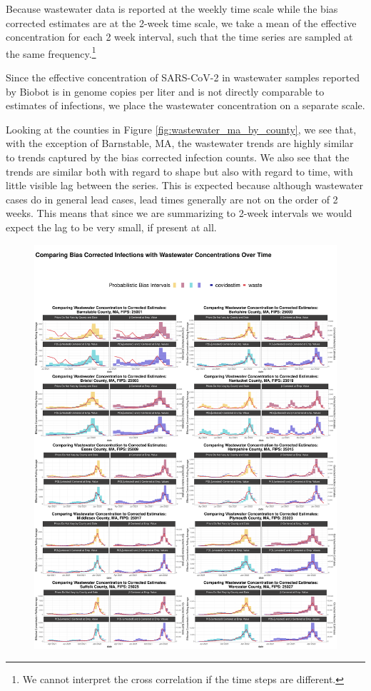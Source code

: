 \documentclass[12pt,twoside]{smiththesis}
\begin{document}
Because wastewater data is reported at the weekly time scale while the bias corrected estimates are at the 2-week time scale, we take a mean of the effective concentration for each 2 week interval, such that the time series are sampled at the same frequency.\footnote{We cannot interpret the cross correlation if the time steps are different.}

Since the effective concentration of SARS-CoV-2 in wastewater samples reported by Biobot is in genome copies per liter and is not directly comparable to estimates of infections, we place the wastewater concentration on a separate scale.

Looking at the counties in Figure \ref{fig:wastewater_ma_by_county}, we see that, with the exception of Barnstable, MA, the wastewater trends are highly similar to trends captured by the bias corrected infection counts. We also see that the trends are similar both with regard to shape but also with regard to time, with little visible lag between the series. This is expected because although wastewater cases do in general lead cases, lead times generally are not on the order of 2 weeks. This means that since we are summarizing to 2-week intervals we would expect the lag to be very small, if present at all.
\begin{figure}
\includegraphics[width=1\linewidth]{figure/wastewater_ma_by_county} \caption{\label{fig:wastewater_ma_by_county}}\label{fig:unnamed-chunk-23}
\end{figure}
\end{document}
